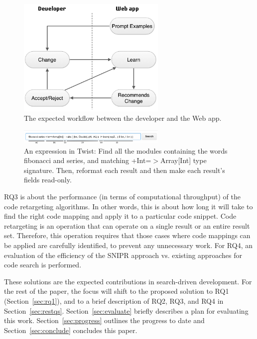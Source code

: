 \documentclass[conference]{IEEEtran}
\begin{document}
\begin{figure}[!t]
    \centering
    \includegraphics[width=2.8in]{images/workflow}
    \caption{The expected workflow between the developer and the Web app.}
    \label{fig:workflow}
\end{figure}

\begin{figure}[!t]
    \centering
    \includegraphics[width=2.8in]{images/twistcmd}
    \caption{An expression in Twist: Find all the modules containing the words 
    fibonacci and series, and matching +Int=$>$Array[Int] type signature. Then, 
    reformat each result and then make each result's fields read-only.}
    \label{fig:twistcmd}
\end{figure}

RQ3 is about the performance (in terms of computational throughput) of the code retargeting algorithms. In other words, this is about how long it will take to find the right code mapping and apply it to a particular code snippet. Code retargeting is an operation that can operate on a single result or an entire result set. Therefore, this operation requires that those cases where code mappings can be applied are carefully identified, to prevent any unnecessary work. For RQ4, an evaluation of the efficiency of the \uppercase{SnipR} approach vs. existing approaches for code search is performed. 

These solutions are the expected contributions in search-driven development. For the rest of the paper, the focus will shift to the proposed solution to RQ1 (Section~\ref{sec:rq1}), and to a brief description of RQ2, RQ3, and RQ4 in Section~\ref{sec:restqs}. Section~\ref{sec:evaluate} briefly describes a plan for evaluating this work. Section~\ref{sec:progress} outlines the progress to date and Section~\ref{sec:conclude} concludes this paper. 
\end{document}
